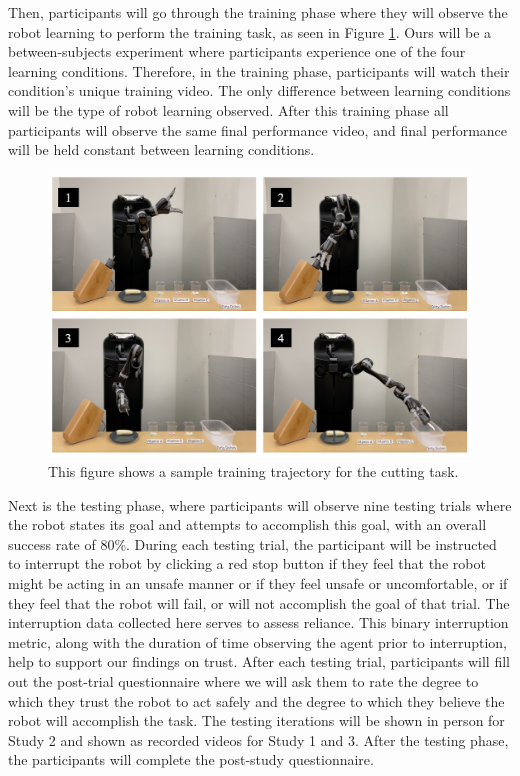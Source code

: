 \documentclass[letterpaper]{article} %
\begin{document}
Then, participants will go through the training phase where they will observe the robot learning to perform the training task, as seen in Figure \ref{fig:training_flow}. Ours will be a between-subjects experiment where participants experience one of the four learning conditions. Therefore, in the training phase, participants will watch their condition's unique training video. The only difference between learning conditions will be the type of robot learning observed. After this training phase all participants will observe the same final performance video, and final performance will be held constant between learning conditions.

\begin{figure}[ht]
    \centering
    \includegraphics[width=1\columnwidth]{Figures/training_flow.png}
  \caption{This figure shows a sample training trajectory for the cutting task.}
    \label{fig:training_flow}
\end{figure}

Next is the testing phase, where participants will observe nine testing trials where the robot states its goal and attempts to accomplish this goal, with an overall success rate of 80\%. During each testing trial, the participant will be instructed to interrupt the robot by clicking a red stop button if they feel that the robot might be acting in an unsafe manner or if they feel unsafe or uncomfortable, or if they feel that the robot will fail, or will not accomplish the goal of that trial. The interruption data collected here serves to assess reliance. This binary interruption metric, along with the duration of time observing the agent prior to interruption, help to support our findings on trust. After each testing trial, participants will fill out the post-trial questionnaire where we will ask them to rate the degree to which they trust the robot to act safely and the degree to which they believe the robot will accomplish the task. The testing iterations will be shown in person for Study 2 and shown as recorded videos for Study 1 and 3. After the testing phase, the participants will complete the post-study questionnaire.
\end{document}
